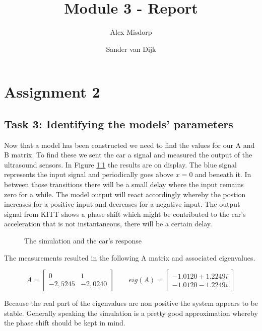 \documentclass[final]{scrreprt} %
\title{Module 3 - Report}
\author{Alex {Misdorp} \and Sander {van Dijk}}
\begin{document}
\chapter{Assignment 2}
\section*{Task 3: Identifying the models' parameters}

\iffalse

Now that a model has been constructed we need to find the values for our A and B matrix. To find these we sent the car a signal and measured the output of the ultrasound sensors. In Figure \ref{fig:KITT-input-output-model} the results are on display.
The blue signal represents the input signal and periodically goes above $x=0$ and beneath it. In between those transitions there will be a small delay where the input remains zero for a while. The model output will react accordingly whereby the postion increases for a positive input and decreases for a negative input.
The output signal from KITT shows a phase shift which might be contributed to the car's acceleration that is not instantaneous, there will be a certain delay.

\begin{figure}[H]
	\centering
    	\setlength\figureheight{4cm}
    	\setlength{}
    	    	
    	\caption{The simulation and the car's response}
    	\label{fig:KITT-input-output-model}
\end{figure}

The measurements resulted in the following A matrix and associated eigenvalues.

\begin{equation}
A=
\begin{bmatrix}
  0 & 1 \\
  -2,5245 & -2,0240
 \end{bmatrix}
\qquad
eig(A)=
\begin{bmatrix}
 -1.0120 + 1.2249i \\
  -1.0120 - 1.2249i
 \end{bmatrix}
\end{equation}

Because the real part of the eigenvalues are non positive the system appears to be stable. Generally speaking the simulation is a pretty good approximation whereby the phase shift should be kept in mind.
\end{document}
